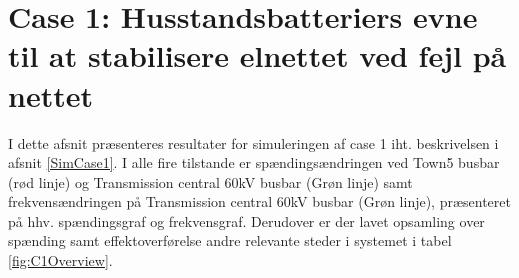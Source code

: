 
\label{ResultatOgDiskussion}

\section{Case 1: Husstandsbatteriers evne til at stabilisere elnettet ved fejl på nettet}
I dette afsnit præsenteres resultater for simuleringen af case 1 iht. beskrivelsen i afsnit \ref{SimCase1}. I alle fire tilstande er spændingsændringen ved Town5 busbar (rød linje) og Transmission central 60kV busbar (Grøn linje) samt frekvensændringen på Transmission central 60kV busbar (Grøn linje), præsenteret på hhv. spændingsgraf og frekvensgraf. Derudover er der lavet opsamling over spænding samt effektoverførelse andre relevante steder i systemet i tabel \ref{fig:C1Overview}. \\ \\

